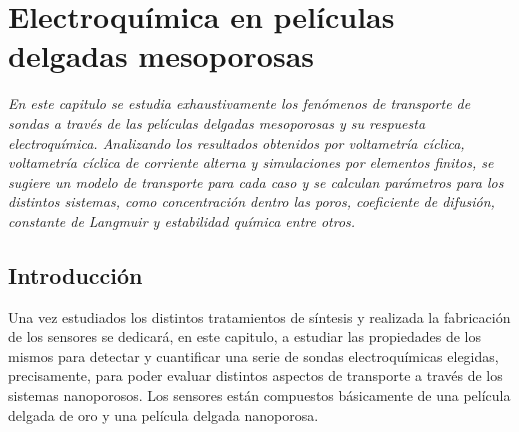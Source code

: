  \newcommand{\NoBiblioEQ}[1]{
 \ifthenelse{\equal{#1}{verdadero}}{}{}
 \NoBiblioEQ{verdadero}}


 \FormatoCapituloDosLineas
 
 \chapter{Electroquímica en películas delgadas mesoporosas}
 \label{chap:Electroquimica}

 \thispagestyle{empty}
	
 \noindent\textit{En este capitulo se estudia exhaustivamente los fenómenos de transporte de sondas a través de las películas delgadas mesoporosas y su respuesta electroquímica. Analizando los resultados obtenidos por voltametría cíclica, voltametría cíclica de corriente alterna y simulaciones por elementos finitos, se sugiere un modelo de transporte para cada caso y se calculan parámetros para los distintos sistemas, como concentración dentro las poros, coeficiente de difusión, constante de Langmuir y estabilidad química entre otros.}

 \vfill
 \minitoc
 \newpage

\section{Introducción}

	Una vez estudiados los distintos tratamientos de síntesis y realizada la fabricación de los sensores se dedicará, en este capitulo, a estudiar las propiedades de los mismos para detectar y cuantificar una serie de sondas electroquímicas elegidas, precisamente, para poder evaluar distintos aspectos de transporte a través de los sistemas nanoporosos. 
	Los sensores están compuestos básicamente de una película delgada de oro y una película delgada nanoporosa.

